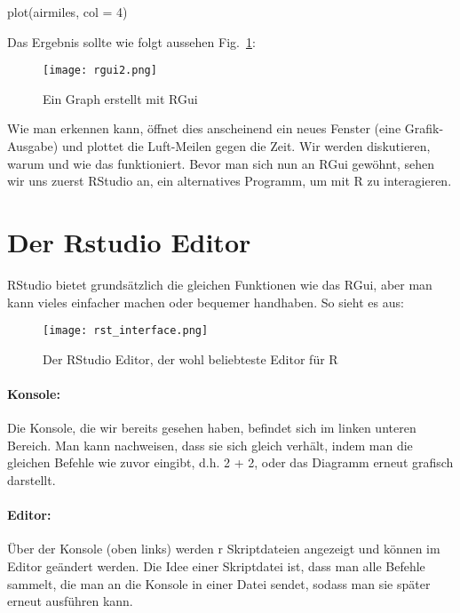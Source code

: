 \documentclass[a4paper,twoside]{tufte-book}\usepackage[]{graphicx}\usepackage[]{color}
\begin{document}
\begin{Anhang}
\begin{Schunk}
\begin{Sinput}
plot(airmiles, col = 4)
\end{Sinput}
\end{Schunk}

Das Ergebnis sollte wie folgt aussehen Fig.~\ref{fig: Rgui2}:

\begin{figure}[]
\begin{center}
\texttt{[image: rgui2.png]}
\caption{Ein Graph erstellt mit RGui}
\label{fig: Rgui2}
\end{center}
\end{figure}

Wie man erkennen kann, öffnet dies anscheinend ein neues Fenster (eine Grafik-Ausgabe) und plottet die Luft-Meilen gegen die Zeit. Wir werden diskutieren, warum und wie das funktioniert. Bevor man sich nun an RGui gewöhnt, sehen wir uns zuerst RStudio an, ein alternatives Programm, um mit R zu interagieren.

\section{Der Rstudio Editor}
 
RStudio bietet grundsätzlich die gleichen Funktionen wie das RGui, aber man kann vieles einfacher machen oder bequemer handhaben. So sieht es aus:

\begin{figure}[]
\begin{center}
\texttt{[image: rst\_interface.png]}
\caption{Der RStudio Editor, der wohl beliebteste Editor für R}
\label{fig: Rstudio}
\end{center}
\end{figure}


\paragraph{Konsole:} Die Konsole, die wir bereits gesehen haben, befindet sich im linken unteren Bereich. Man kann nachweisen, dass sie sich gleich verhält, indem man die gleichen Befehle wie zuvor eingibt, d.h. 2 + 2, oder das Diagramm erneut grafisch darstellt.

\paragraph{Editor:} Über der Konsole (oben links) werden r Skriptdateien angezeigt und können im Editor geändert werden. Die Idee einer Skriptdatei ist, dass man alle Befehle sammelt, die man an die Konsole in einer Datei sendet, sodass man sie später erneut ausführen kann.  


\end{Anhang}
\end{document}
